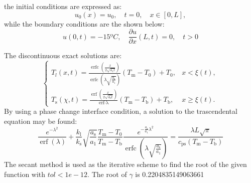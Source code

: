 the initial conditions are expressed as:
\begin{equation}
	u_{0}(x)=u_{0}, \quad t=0, \quad x \in[0, L],
\end{equation}
while the boundary conditions are the shown below:
\begin{equation}
u(0, t)=-15ºC, \quad \frac{\partial u}{\partial x}(L, t)=0, \quad t>0
\end{equation}

The discontinuous exact solutions are:
\begin{equation}
	\begin{cases}T_{l}(x, t)=\frac{\operatorname{erfc}\left(\frac{x}{2 \sqrt{a_{1} t}}\right)}{\operatorname{erfc}\left(\lambda \sqrt{\frac{a_{\mathrm{s}}}{a_{1}}}\right)}\left(T_{\mathrm{m}}-T_{0}\right)+T_{0}, & x<\xi(t), \\ 
	T_{\mathrm{s}}(\chi, t)=\frac{\operatorname{erf}\left(\frac{x}{2 \sqrt{a_{\mathrm{s}} t}}\right)}{\operatorname{erf \cdot\lambda }}\left(T_{\mathrm{m}}-T_{\mathrm{b}}\right)+T_{\mathrm{b}},& x \geq \xi(t)  .\end{cases}
\end{equation}
By using a phase change interface condition, a solution to the trascendental equation may be found:
\begin{equation}
	\frac{e^{-\lambda^{2}}}{\operatorname{erf}(\lambda)}+\frac{k_{\mathrm{l}}}{k_{\mathrm{s}}} \sqrt{\frac{a_{\mathrm{s}}}{a_{1}}} \frac{T_{\mathrm{m}}-T_{0}}{T_{\mathrm{m}}-T_{\mathrm{b}}} \frac{e^{-\frac{a_{\mathrm{s}}}{a_{1}} \lambda^{2}}}{\operatorname{erfc}\left(\lambda \sqrt{\frac{a_{\mathrm{s}}}{a_{1}}}\right)}=\frac{\lambda L \sqrt{\pi}}{c_{\mathrm{ps}}\left(T_{\mathrm{m}}-T_{\mathrm{b}}\right)}
\end{equation}
The secant method is used as the iterative scheme to find the root of the given function with $tol<1e-12$. The root of $\gamma$ is 0.2204835149063661

